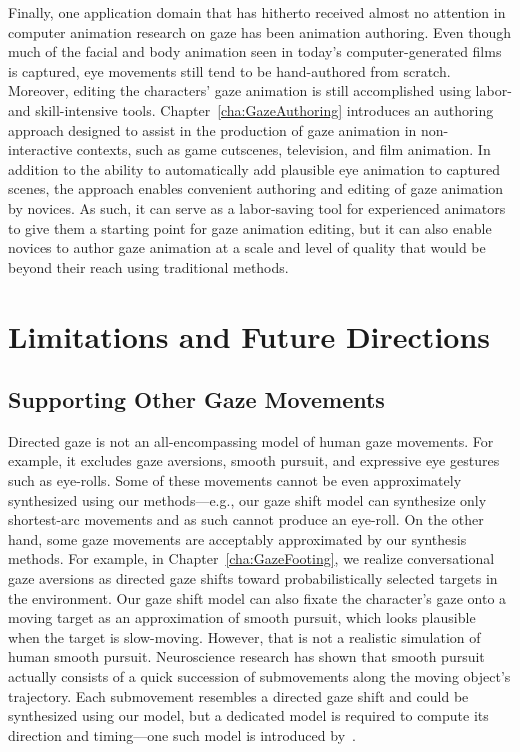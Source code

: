 Finally, one application domain that has hitherto received almost no attention in computer animation research on gaze has been animation authoring. Even though much of the facial and body animation seen in today's computer-generated films is captured, eye movements still tend to be hand-authored from scratch. Moreover, editing the characters' gaze animation is still accomplished using labor- and skill-intensive tools. Chapter~\ref{cha:GazeAuthoring} introduces an authoring approach designed to assist in the production of gaze animation in non-interactive contexts, such as game cutscenes, television, and film animation. In addition to the ability to automatically add plausible eye animation to captured scenes, the approach enables convenient authoring and editing of gaze animation by novices. As such, it can serve as a labor-saving tool for experienced animators to give them a starting point for gaze animation editing, but it can also enable novices to author gaze animation at a scale and level of quality that would be beyond their reach using traditional methods.

\section{Limitations and Future Directions}

\subsection{Supporting Other Gaze Movements}

Directed gaze is not an all-encompassing model of human gaze movements. For example, it excludes gaze aversions, smooth pursuit, and expressive eye gestures such as eye-rolls. Some of these movements cannot be even approximately synthesized using our methods---e.g., our gaze shift model can synthesize only shortest-arc movements and as such cannot produce an eye-roll. On the other hand, some gaze movements are acceptably approximated by our synthesis methods. For example, in Chapter~\ref{cha:GazeFooting}, we realize conversational gaze aversions as directed gaze shifts toward probabilistically selected targets in the environment. Our gaze shift model can also fixate the character's gaze onto a moving target as an approximation of smooth pursuit, which looks plausible when the target is slow-moving. However, that is not a realistic simulation of human smooth pursuit. Neuroscience research has shown that smooth pursuit actually consists of a quick succession of submovements along the moving object's trajectory. Each submovement resembles a directed gaze shift and could be synthesized using our model, but a dedicated model is required to compute its direction and timing---one such model is introduced by~\citet{yeo2012eyecatch}.

